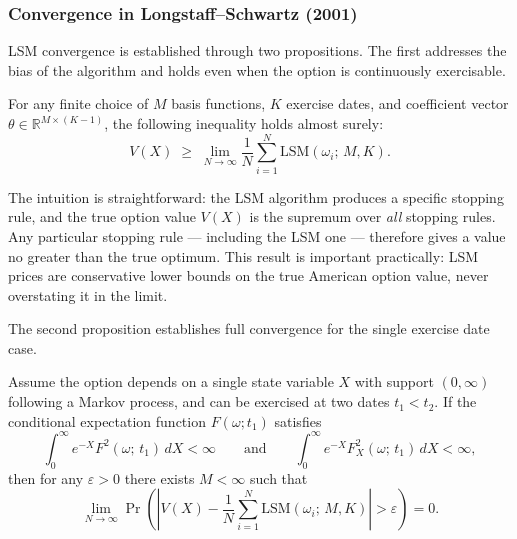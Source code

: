 \subsubsection{Convergence in Longstaff--Schwartz (2001)}

LSM convergence is established through two propositions. The first
addresses the bias of the algorithm and holds even when the option is
continuously exercisable.

\begin{proposition}
\label{prop:LSM_bias}
For any finite choice of $M$ basis functions, $K$ exercise dates, and
coefficient vector $\theta \in \mathbb{R}^{M \times (K-1)}$, the
following inequality holds almost surely:
\begin{equation}
    V(X) \;\geq\; \lim_{N \to \infty} \frac{1}{N}
    \sum_{i=1}^{N} \mathrm{LSM}(\omega_i;\, M, K).
    \label{eq:LSM_bias}
\end{equation}
\end{proposition}

The intuition is straightforward: the LSM algorithm produces a specific
stopping rule, and the true option value $V(X)$ is the supremum over
\emph{all} stopping rules. Any particular stopping rule --- including the
LSM one --- therefore gives a value no greater than the true optimum.
This result is important practically: LSM prices are conservative lower
bounds on the true American option value, never overstating it in the
limit.

The second proposition establishes full convergence for the single
exercise date case.

\begin{proposition}
\label{prop:LSM_convergence}
Assume the option depends on a single state variable $X$ with support
$(0, \infty)$ following a Markov process, and can be exercised at two
dates $t_1 < t_2$. If the conditional expectation function $F(\omega; t_1)$
satisfies
\[
    \int_0^\infty e^{-X} F^2(\omega;\, t_1)\, dX < \infty
    \qquad \text{and} \qquad
    \int_0^\infty e^{-X} F_X^2(\omega;\, t_1)\, dX < \infty,
\]
then for any $\varepsilon > 0$ there exists $M < \infty$ such that
\begin{equation}
    \lim_{N \to \infty} \Pr\!\left(
        \left| V(X) - \frac{1}{N} \sum_{i=1}^{N}
        \mathrm{LSM}(\omega_i;\, M, K) \right| > \varepsilon
    \right) = 0.
    \label{eq:LSM_convergence}
\end{equation}
\end{proposition}

